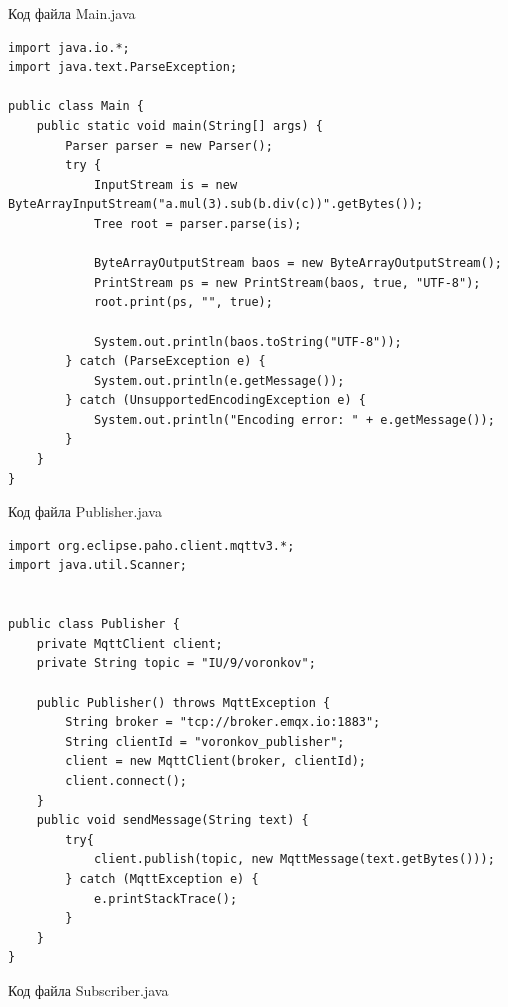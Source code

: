 \documentclass[a4paper, 14pt]{extarticle}
\begin{document}
\par
Код файла Main.java
\begin{lstlisting}
import java.io.*;
import java.text.ParseException;

public class Main {
    public static void main(String[] args) {
        Parser parser = new Parser();
        try {
            InputStream is = new ByteArrayInputStream("a.mul(3).sub(b.div(c))".getBytes());
            Tree root = parser.parse(is);

            ByteArrayOutputStream baos = new ByteArrayOutputStream();
            PrintStream ps = new PrintStream(baos, true, "UTF-8");
            root.print(ps, "", true);

            System.out.println(baos.toString("UTF-8"));
        } catch (ParseException e) {
            System.out.println(e.getMessage());
        } catch (UnsupportedEncodingException e) {
            System.out.println("Encoding error: " + e.getMessage());
        }
    }
}
\end{lstlisting}
\par
Код файла Publisher.java
\begin{lstlisting}
import org.eclipse.paho.client.mqttv3.*;
import java.util.Scanner;


public class Publisher {
    private MqttClient client;
    private String topic = "IU/9/voronkov";

    public Publisher() throws MqttException {
        String broker = "tcp://broker.emqx.io:1883";
        String clientId = "voronkov_publisher";
        client = new MqttClient(broker, clientId);
        client.connect();
    }
    public void sendMessage(String text) {
        try{
            client.publish(topic, new MqttMessage(text.getBytes()));
        } catch (MqttException e) {
            e.printStackTrace();
        }
    }
}
\end{lstlisting}
\par
Код файла Subscriber.java
\end{document}
